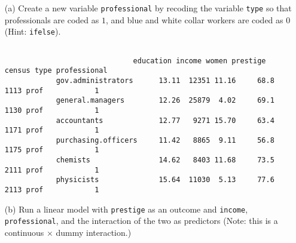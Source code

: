 \documentclass[12pt,letterpaper]{article}
\begin{document}
\newpage
\begin{enumerate}
	
	\item [(a)]
	Create a new variable \texttt{professional} by recoding the variable \texttt{type} so that professionals are coded as $1$, and blue and white collar workers are coded as $0$ (Hint: \texttt{ifelse}).
	
	
	\begin{footnotesize}
		\begin{verbatim}
			
			                  education income women prestige census type professional
			gov.administrators      13.11  12351 11.16     68.8   1113 prof            1
			general.managers        12.26  25879  4.02     69.1   1130 prof            1
			accountants             12.77   9271 15.70     63.4   1171 prof            1
			purchasing.officers     11.42   8865  9.11     56.8   1175 prof            1
			chemists                14.62   8403 11.68     73.5   2111 prof            1
			physicists              15.64  11030  5.13     77.6   2113 prof            1
		\end{verbatim}
	\end{footnotesize}
	
	\vspace{6cm}
	\newpage

	
	\item [(b)]
	Run a linear model with \texttt{prestige} as an outcome and \texttt{income}, \texttt{professional}, and the interaction of the two as predictors (Note: this is a continuous $\times$ dummy interaction.)
	
\begin{table}[!htbp] \centering 
	\caption{} 
	\label{} 


\end{table}
\end{enumerate}
\end{document}
